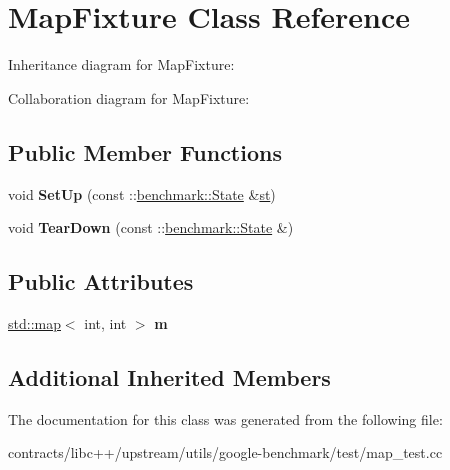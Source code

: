 \hypertarget{class_map_fixture}{}\section{Map\+Fixture Class Reference}
\label{class_map_fixture}


Inheritance diagram for Map\+Fixture\+:


Collaboration diagram for Map\+Fixture\+:
\subsection*{Public Member Functions}
\begin{DoxyCompactItemize}
\item 
\mbox{\label{class_map_fixture_a74b2a7cfcdd9d8756ba7c9f1a3138423}} 
void {\bfseries Set\+Up} (const \+::\mbox{\hyperlink{classbenchmark_1_1_state}{benchmark\+::\+State}} \&\mbox{\hyperlink{structst}{st}})
\item 
\mbox{\label{class_map_fixture_a8100332323a4c911c51da1c5359d6c95}} 
void {\bfseries Tear\+Down} (const \+::\mbox{\hyperlink{classbenchmark_1_1_state}{benchmark\+::\+State}} \&)
\end{DoxyCompactItemize}
\subsection*{Public Attributes}
\begin{DoxyCompactItemize}
\item 
\mbox{\label{class_map_fixture_a75a2659fe0f004b110efe706d3e838a8}} 
\mbox{\hyperlink{classstd_1_1map}{std\+::map}}$<$ int, int $>$ {\bfseries m}
\end{DoxyCompactItemize}
\subsection*{Additional Inherited Members}


The documentation for this class was generated from the following file\+:\begin{DoxyCompactItemize}
\item 
contracts/libc++/upstream/utils/google-\/benchmark/test/map\+\_\+test.\+cc\end{DoxyCompactItemize}
